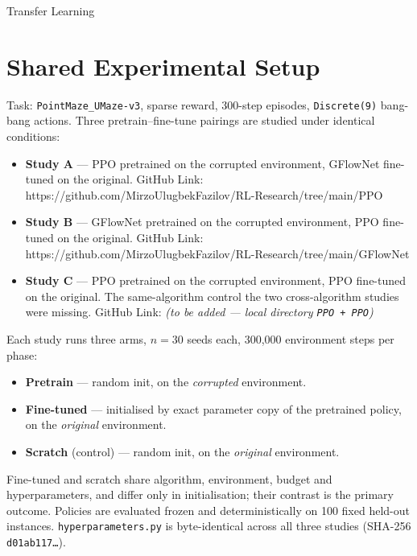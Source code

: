 Transfer Learning

\section{Shared Experimental Setup}

Task: \texttt{PointMaze\_UMaze-v3}, sparse reward, 300-step episodes,
\texttt{Discrete(9)} bang-bang actions. Three pretrain--fine-tune pairings are
studied under identical conditions:

\begin{itemize}
  \item \textbf{Study A} --- PPO pretrained on the corrupted environment, GFlowNet fine-tuned on the original.
GitHub Link: https://github.com/MirzoUlugbekFazilov/RL-Research/tree/main/PPO%

  \item \textbf{Study B} --- GFlowNet pretrained on the corrupted environment, PPO fine-tuned on the original.
GitHub Link: https://github.com/MirzoUlugbekFazilov/RL-Research/tree/main/GFlowNet%

  \item \textbf{Study C} --- PPO pretrained on the corrupted environment, PPO fine-tuned on the original. The same-algorithm control the two cross-algorithm studies were missing.
GitHub Link: \emph{(to be added --- local directory \texttt{PPO + PPO})}
\end{itemize}

Each study runs three arms, $n=30$ seeds each, 300,000 environment steps per
phase:

\begin{itemize}
  \item \textbf{Pretrain} --- random init, on the \emph{corrupted} environment.
  \item \textbf{Fine-tuned} --- initialised by exact parameter copy of the pretrained policy, on the \emph{original} environment.
  \item \textbf{Scratch} (control) --- random init, on the \emph{original} environment.
\end{itemize}

Fine-tuned and scratch share algorithm, environment, budget and
hyperparameters, and differ only in initialisation; their contrast is the
primary outcome. Policies are evaluated frozen and deterministically on 100
fixed held-out instances. \texttt{hyperparameters.py} is byte-identical across
all three studies (SHA-256 \texttt{d01ab117\dots}).

